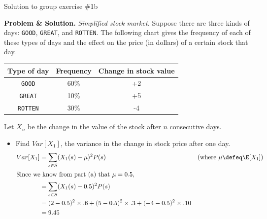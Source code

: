 \documentclass[10pt]{beamer}
\begin{document}
\begin{frame}{Solution to group exercise \#1b}
\footnotesize 

\textbf{Problem \& Solution.} \textit{Simplified stock market.} Suppose there are three kinds of days: \texttt{GOOD}, \texttt{GREAT}, and \texttt{ROTTEN}. The following chart gives the frequency of each of these types of days and the effect on the price (in dollars) of a certain stock that day.
	\vspace{-.2cm}
	\begin{table}[H]
	\begin{tabular}{|c|c|c|}
	\toprule 
	\colorbox{blue!30}{Type of day} & 	\colorbox{blue!30}{Frequency} & \colorbox{blue!30}{Change in stock value} \\
	\midrule 
	\texttt{GOOD} & 60\% & +2 \\
	\texttt{GREAT} & 10\% & +5 \\
	\texttt{ROTTEN} & 30\% & -4 \\
	\bottomrule 
	\end{tabular}
	\end{table}
	\vspace{-.2cm}
	Let $X_n$ be the change in the value of the stock after $n$ consecutive days.
		\vspace{-.2cm}
	 \begin{itemize} \footnotesize 
	\item[b.] Find  $Var[X_1]$, the variance in the change in stock price after one day.
	\begin{align*}
	 Var[X_1] &= \sum_{s \in S} (X_1(s)-\mu)^2 P(s)  && \text{(where $\mu \defeq \E[X_1]$)} \\
	 \intertext{Since we know from part (a) that $\mu=0.5$,}
	 &= \sum_{s \in S} (X_1(s)-0.5)^2 P(s) \\
	 &= (2 - 0.5)^2 \times .6 + 	(5-0.5)^2 \times .3 + (-4-0.5)^2 \times .10 \\
	 &= 9.45
	\end{align*}
	\end{itemize}
\end{frame}
\end{document}
